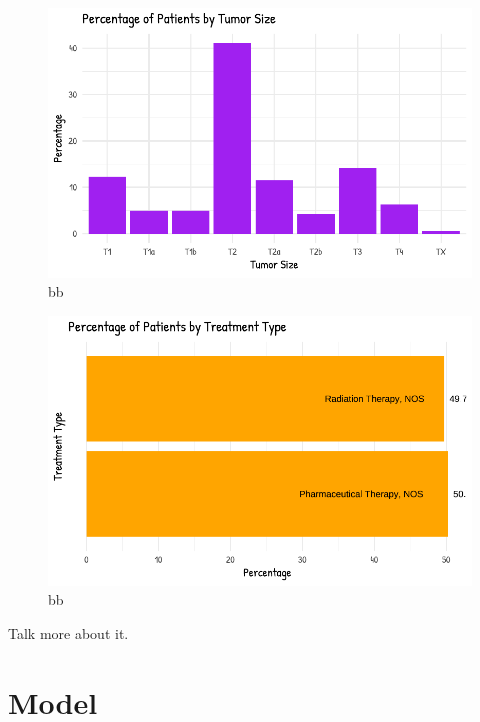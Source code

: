 \documentclass[
  letterpaper,
  DIV=11,
  numbers=noendperiod]{scrartcl}
\begin{document}
\begin{figure}

{\centering \includegraphics{paper_files/figure-pdf/fig-bills-5.pdf}

}

\caption{\label{fig-bills-5}bb}

\end{figure}

\begin{figure}

{\centering \includegraphics{paper_files/figure-pdf/fig-bills-6.pdf}

}

\caption{\label{fig-bills-6}bb}

\end{figure}

Talk more about it.

\hypertarget{sec-model}{%
\section{Model}\label{sec-model}}
\end{document}
